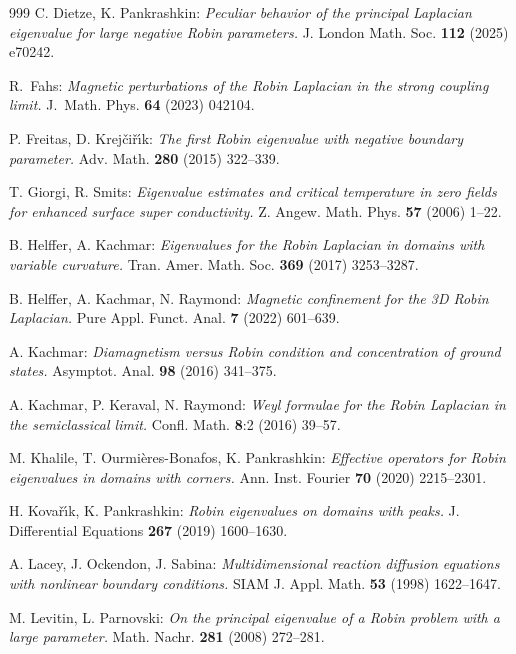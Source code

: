 \documentclass[11pt,oneside,reqno,a4paper]{amsart}
\theoremstyle{definition}
\begin{document}
\begin{thebibliography}{999}
 C. Dietze, K. Pankrashkin: \emph{Peculiar behavior of the principal Laplacian eigenvalue for large negative Robin parameters.} J. London Math. Soc. {\bf 112} (2025) e70242.
		
		 R.~Fahs: \emph{Magnetic perturbations of the Robin Laplacian in the strong coupling limit.}
J.~Math. Phys. {\bf 64} (2023) 042104.

		 P. Freitas, D. Krej\v{c}i\v{r}\'{\i}k: \emph{The first Robin eigenvalue with negative boundary parameter.} Adv. Math. {\bf 280} (2015) 322--339.
		
		
		 T. Giorgi, R. Smits: \emph{Eigenvalue
			estimates and critical temperature in zero fields for enhanced surface
			super conductivity.} Z. Angew. Math. Phys. {\bf 57} (2006) 1--22. 
			
			
		B. Helffer, A. Kachmar:
		\emph{Eigenvalues for the Robin Laplacian in domains with variable curvature.}
		Tran. Amer. Math. Soc. {\bf 369} (2017) 3253--3287.
		
		B. Helffer, A. Kachmar, N. Raymond:
		\emph{Magnetic confinement for the 3D Robin Laplacian.}
		Pure Appl. Funct. Anal. {\bf 7} (2022) 601--639.
		
		A. Kachmar: \emph{Diamagnetism versus Robin condition and concentration of ground states.}
		Asymptot. Anal. {\bf 98} (2016) 341--375.
		
		A. Kachmar, P. Keraval, N. Raymond: \emph{Weyl formulae for the Robin Laplacian in the semiclassical limit.} Confl. Math. {\bf 8}:2 (2016) 39--57.
		
		M. Khalile, T. Ourmi\`eres-Bonafos, K. Pankrashkin: \emph{Effective operators for Robin eigenvalues in domains with corners.} Ann. Inst. Fourier {\bf 70} (2020) 2215--2301.
		
		
		
		  H. Kova\v{r}\'{\i}k, K. Pankrashkin: \emph{Robin eigenvalues on domains with peaks.}
		J. Differential Equations {\bf 267} (2019) 1600--1630.
		
 A. Lacey, J. Ockendon, J. Sabina:
\emph{Multidimensional reaction diffusion equations with nonlinear
	boundary conditions.} SIAM J. Appl. Math. {\bf 53} (1998) 1622--1647. 		
				
		 M. Levitin, L. Parnovski: \emph{On the principal eigenvalue of a Robin problem with a large parameter.} Math. Nachr. \textbf{281} (2008) 272--281.


\end{thebibliography}
\end{document}
